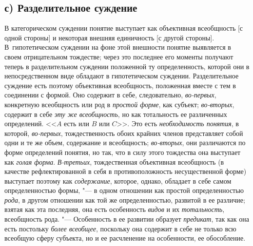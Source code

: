 {\subsection[с) Разделительное суждение]{с) Разделительное суждение}
В категорическом суждении понятие выступает как объективная
всеобщность [с одной стороны] и некоторая внешняя единичность [с другой
стороны]. В~гипотетическом суждении на фоне этой внешности понятие
выявляется в своем отрицательном тождестве; через это последнее его моменты
получают теперь в разделительном суждении положенной ту определенность,
которой они в непосредственном виде обладают в гипотетическом суждении.
Разделительное суждение есть поэтому объективная всеобщность, положенная
вместе с тем в соединении с формой. Оно содержит в себе, следовательно,
{\em во-первых}, конкретную всеобщность или род в {\em простой форме}, как
субъект; {\em во-вторых}, содержит в себе {\em эту
же всеобщность}, но как тотальность ее
различенных определений. <<$A$ есть или $B$ или $C$>>. Это есть
{\em необходимость понятия}, в которой, {\em во-первых},
тождественность обоих крайних членов представляет собой одни
и те же объем, содержание и всеобщность;
{\em во-вторых}, они
различаются по форме определений понятия, но так, что в силу этого
тождества она выступает как {\em голая
форма}. {\em В-третьих},
тождественная объективная всеобщность (в качестве
рефлектированной в себя в противоположность несущественной форме) выступает
поэтому как {\em содержание},
которое, однако, обладает в себе самом определенностью
формы, "--- в одном отношении как простой определенностью
{\em рода}, в другом
отношении как той же определенностью, развитой в ее различие; взятая как
эта последняя, она есть особенность {\em видов} и их {\em тотальность},
всеобщность рода. "--- Особенность в ее развитии
образует {\em предикат}, так как она есть постольку {\em более всеобщее},
поскольку она содержит в себе не только всю всеобщую сферу
субъекта, но и ее расчленение на особенности, ее обособление.

}
